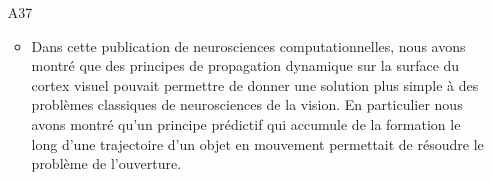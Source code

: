 \begin{enumerate}
\item[A37]  %
\begin{itemize}
  \item Dans cette publication de neurosciences computationnelles, nous avons montré que des principes de propagation dynamique sur la surface du cortex visuel pouvait permettre de donner une solution plus simple à des problèmes classiques de neurosciences de la vision. En particulier nous avons montré qu'un principe prédictif qui accumule de la formation le long d'une trajectoire d'un objet en mouvement permettait de résoudre le problème de l'ouverture.
\end{itemize}

%
%
%


\end{enumerate}
